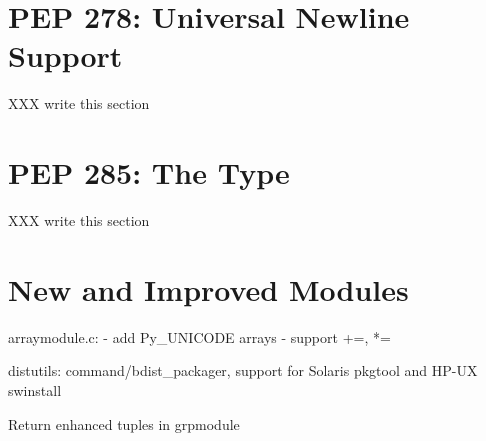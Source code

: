 \documentclass{howto}
\begin{document}
\begin{seealso}


\end{seealso}


\section{PEP 278: Universal Newline Support}

XXX write this section



\begin{seealso}


\end{seealso}

\section{PEP 285: The  Type}

XXX write this section

\begin{seealso}


\end{seealso}


\section{New and Improved Modules}

arraymodule.c: - add Py_UNICODE arrays
- support +=, *=

distutils: command/bdist_packager, support for Solaris pkgtool 
and HP-UX swinstall

Return enhanced tuples in grpmodule
\end{document}

